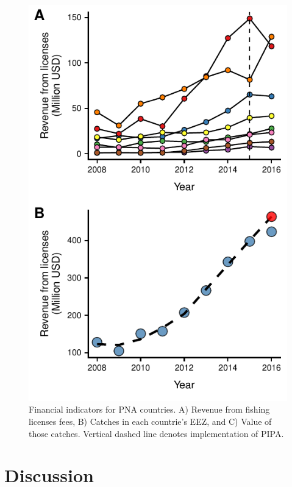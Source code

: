 \documentclass[9p,twocolumn,twoside,lineno]{pnas-new}
\begin{document}
\begin{figure}
\centering
	\includegraphics{img/financial_indicators.pdf}
	\caption{\label{fig:financial_indicators}Financial indicators for PNA countries. A) Revenue from fishing licenses fees, B) Catches in each countrie's EEZ, and C) Value of those catches. Vertical dashed line denotes implementation of PIPA.}
\end{figure}


\clearpage

\section{Discussion}\label{discussion}
\end{document}
